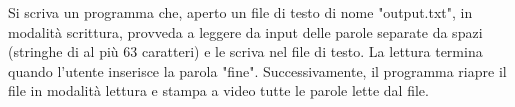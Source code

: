 \begin{Exercise}[label={ex:lettura_scrittura}]
    Si scriva un programma che, aperto un file di testo di nome "output.txt", in 
    modalità scrittura, provveda a leggere da input delle parole separate da spazi
    (stringhe di al più 63 caratteri) e le scriva nel file di testo.
    La lettura termina quando l'utente inserisce la parola "fine".
    Successivamente, il programma riapre il file in modalità lettura e stampa a video
    tutte le parole lette dal file.
\end{Exercise}

\begin{Answer}[ref={ex:lettura_scrittura}]
  	
\end{Answer}